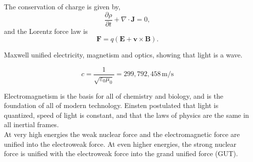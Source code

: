 \vspace{0.5cm}
The \textsf{conservation of charge} is given by,
\begin{equation}
  \frac{\partial \rho}{\partial t} + \nabla \cdot \mathbf{J} = 0, 
\end{equation}
and the \textsf{Lorentz force law} is
\begin{equation}
  \mathbf{F} = q(\mathbf{E} + \mathbf{v} \times \mathbf{B}).
\end{equation}

Maxwell unified electricity, magnetism and optics, showing that light is a wave. 
\begin{Note}
  \begin{equation}
    c = \frac{1}{\sqrt{\varepsilon_0 \mu_0}} = 299,792,458 \, \text{m/s}
  \end{equation}
\end{Note}\vspace{0.5cm}

Electromagnetism is the basis for all of chemistry and biology, and is the foundation of all of modern technology. Einsten postulated that light is quantized, speed of light is constant, and that the laws of physics are the same in all inertial frames.\\

At very high energies the \textsf{weak nuclear force} and the \textsf{electromagnetic force} are unified into the \textsf{electroweak force}. At even higher energies, the \textsf{strong nuclear force} is unified with the electroweak force into the \textsf{grand unified force (GUT)}.
\begin{center}
\end{center}
